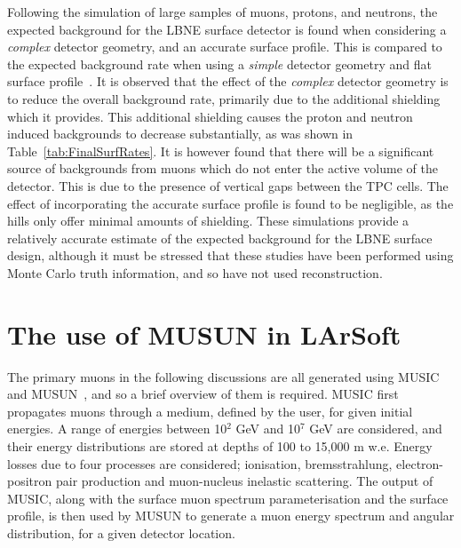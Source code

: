 Following the simulation of large samples of muons, protons, and neutrons, the expected background for the LBNE surface detector is found when considering a \emph{complex} detector geometry, and an accurate surface profile. This is compared to the expected background rate when using a \emph{simple} detector geometry and flat surface profile~\citep{MartinsThesis}. It is observed that the effect of the \emph{complex} detector geometry is to reduce the overall background rate, primarily due to the additional shielding which it provides. This additional shielding causes the proton and neutron induced backgrounds to decrease substantially, as was shown in Table~\ref{tab:FinalSurfRates}. It is however found that there will be a significant source of backgrounds from muons which do not enter the active volume of the detector. This is due to the presence of vertical gaps between the TPC cells. The effect of incorporating the accurate surface profile is found to be negligible, as the hills only offer minimal amounts of shielding. These simulations provide a relatively accurate estimate of the expected background for the LBNE surface design, although it must be stressed that these studies have been performed using Monte Carlo truth information, and so have not used reconstruction. \\

\section{The use of MUSUN in LArSoft} \label{sec:FDIncorporation}  %
The primary muons in the following discussions are all generated using MUSIC~\citep{MUSUN, MUSIC, MUSIC2} and MUSUN~\citep{MUSUN, MUSUN2}, and so a brief overview of them is required. MUSIC first propagates muons through a medium, defined by the user, for given initial energies. A range of energies between 10$^2$ GeV and 10$^7$ GeV are considered, and their energy distributions are stored at depths of 100 to 15,000 m w.e. Energy losses due to four processes are considered; ionisation, bremsstrahlung, electron-positron pair production and muon-nucleus inelastic scattering. The output of MUSIC, along with the surface muon spectrum parameterisation and the surface profile, is then used by MUSUN to generate a muon energy spectrum and angular distribution, for a given detector location. \\

